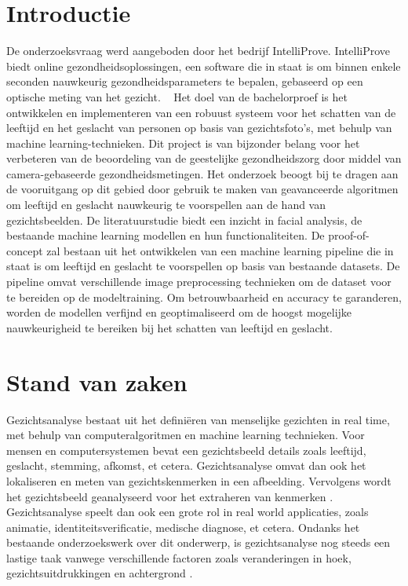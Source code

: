 
\section{Introductie}%
\label{sec:vintroductie}

De onderzoeksvraag werd aangeboden door het bedrijf IntelliProve. IntelliProve biedt online gezondheidsoplossingen, een software die in staat is om binnen enkele seconden nauwkeurig gezondheidsparameters te bepalen, gebaseerd op een optische meting van het gezicht.  
Het doel van de bachelorproef is het ontwikkelen en implementeren van een robuust systeem voor het schatten van de leeftijd en het geslacht van personen op basis van gezichtsfoto's, met behulp van machine learning-technieken. 
Dit project is van bijzonder belang voor het verbeteren van de beoordeling van de geestelijke gezondheidszorg door middel van camera-gebaseerde gezondheidsmetingen. Het onderzoek beoogt bij te dragen aan de vooruitgang op dit gebied door gebruik te maken van geavanceerde algoritmen om leeftijd en geslacht nauwkeurig te voorspellen aan de hand van gezichtsbeelden.
De literatuurstudie biedt een inzicht in facial analysis, de bestaande machine learning modellen en hun functionaliteiten. De proof-of-concept zal bestaan uit het ontwikkelen van een machine learning pipeline die in staat is om leeftijd en geslacht te voorspellen op basis van bestaande datasets. De pipeline omvat verschillende image preprocessing technieken om de dataset voor te bereiden op de modeltraining. Om betrouwbaarheid en accuracy te garanderen, worden de modellen verfijnd en geoptimaliseerd om de hoogst mogelijke nauwkeurigheid te bereiken bij het schatten van leeftijd en geslacht.

\section{Stand van zaken}
\label{sec:vstand-van-zaken}

Gezichtsanalyse bestaat uit het definiëren van menselijke gezichten in real time, met behulp van computeralgoritmen en machine learning technieken. Voor mensen en computersystemen bevat een gezichtsbeeld details zoals leeftijd, geslacht, stemming, afkomst, et cetera.
Gezichtsanalyse omvat dan ook het lokaliseren en meten van gezichtskenmerken in een afbeelding. Vervolgens wordt het gezichtsbeeld geanalyseerd voor het extraheren van kenmerken \autocite{Sanil2023}. Gezichtsanalyse speelt dan ook een grote rol in real world applicaties, zoals animatie, identiteitsverificatie, medische diagnose, et cetera. Ondanks het bestaande onderzoekswerk over dit onderwerp, is gezichtsanalyse nog steeds een lastige taak vanwege verschillende factoren zoals veranderingen in hoek, gezichtsuitdrukkingen en achtergrond \autocite{Siddiqi2022}.

